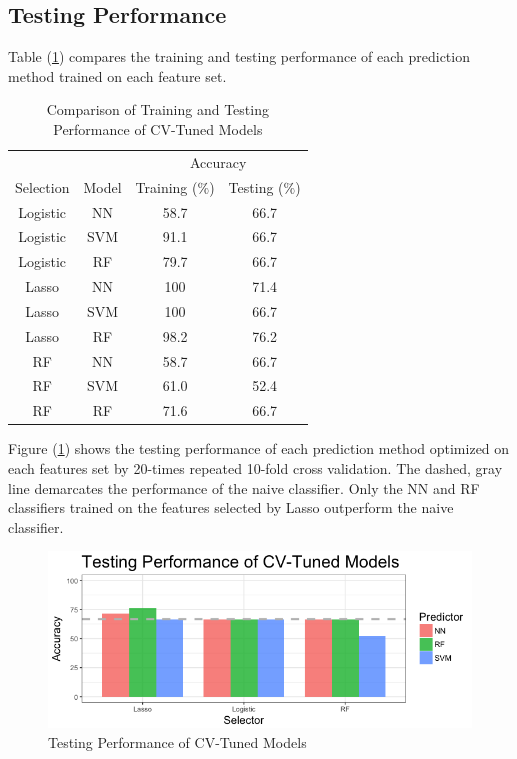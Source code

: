 \documentclass[a4paper]{article}
\begin{document}
\subsection{Testing Performance}
Table (\ref{tab:performance}) compares the training and testing performance of each prediction method trained on each feature set. 

\begin{table}[h!]
\centering
\begin{tabular}{c c | c c}
&&\multicolumn{2}{c}{Accuracy} \\
Selection & Model & Training ($\%$) & Testing ($\%$) \\ \hline
Logistic & NN & 58.7 & 66.7\\
Logistic & SVM & 91.1 & 66.7 \\
Logistic & RF & 79.7& 66.7 \\
Lasso & NN & 100 & 71.4 \\
Lasso & SVM & 100 & 66.7 \\
Lasso & RF & 98.2 & 76.2\\
RF & NN & 58.7 & 66.7\\
RF & SVM & 61.0 & 52.4 \\
RF & RF & 71.6 & 66.7\\
\end{tabular}
\caption{Comparison of Training and Testing Performance of CV-Tuned Models}
\label{tab:performance}
\end{table}

Figure (\ref{fig:04}) shows the testing performance of each prediction method optimized on each features set by 20-times repeated 10-fold cross validation. The dashed, gray line demarcates the performance of the naive classifier. Only the NN and RF classifiers trained on the features selected by Lasso outperform the naive classifier. 

\begin{figure}[h!]
\centering
\includegraphics[scale=0.5]{Fig04.png}
\caption{Testing Performance of CV-Tuned Models}
\label{fig:04}
\end{figure}
\end{document}

